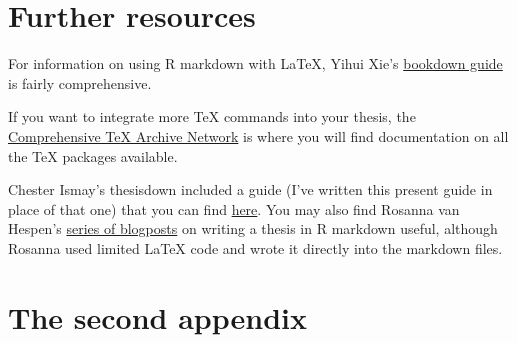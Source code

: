 \documentclass[12pt, oneside]{queensuthesis}
\numberwithin{equation}{chapter}       %
\begin{document}
\hypertarget{further-resources}{%
\chapter{Further resources}\label{further-resources}}

For information on using R markdown with LaTeX, Yihui Xie's \href{https://bookdown.org/yihui/bookdown/}{bookdown guide} is fairly comprehensive.

If you want to integrate more TeX commands into your thesis, the \href{https://www.ctan.org/}{Comprehensive TeX Archive Network} is where you will find documentation on all the TeX packages available.

Chester Ismay's thesisdown included a guide (I've written this present guide in place of that one) that you can find \href{https://raw.githubusercontent.com/ismayc/thesisdown_book/master/thesis.pdf}{here}. You may also find Rosanna van Hespen's \href{https://rosannavanhespen.nl/category/rmarkdown/}{series of blogposts} on writing a thesis in R markdown useful, although Rosanna used limited LaTeX code and wrote it directly into the markdown files.

\hypertarget{the-second-appendix}{%
\chapter{The second appendix}\label{the-second-appendix}}
\end{document}
